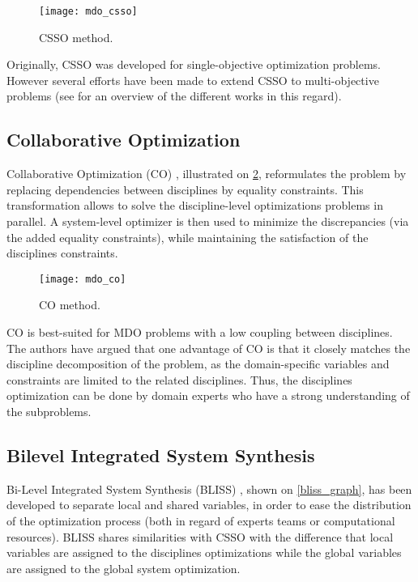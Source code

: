\begin{figure}
\centering
\texttt{[image: mdo\_csso]}
\caption{CSSO method.}\label{csso_graph}
\end{figure}

Originally, CSSO was developed for single-objective optimization problems. However several efforts have been made to extend CSSO to multi-objective problems (see \cite{zhang2011} for an overview of the different works in this regard).

\subsection{Collaborative Optimization}

Collaborative Optimization (CO) \cite{Ilan:1994:MOM:887207}, illustrated on \figurename{} \ref{co_graph}, reformulates the problem by replacing dependencies between disciplines by equality constraints. This transformation allows to solve the discipline-level optimizations problems in parallel. A system-level optimizer is then used to minimize the discrepancies (via the added equality constraints), while maintaining the satisfaction of the disciplines constraints.

\begin{figure}
\centering
\texttt{[image: mdo\_co]}
\caption{CO method.}\label{co_graph}
\end{figure}

CO is best-suited for MDO problems with a low coupling between disciplines. The authors have argued that one advantage of CO is that it closely matches the discipline decomposition of the problem, as the domain-specific variables and constraints are limited to the related disciplines. Thus, the disciplines optimization can be done by domain experts who have a strong understanding of the subproblems.

\subsection{Bilevel Integrated System Synthesis}

Bi-Level Integrated System Synthesis (BLISS) \cite{J.:1998:BIS:886310}, shown on \figurename{} \ref{bliss_graph}, has been developed to separate local and shared variables, in order to ease the distribution of the optimization process (both in regard of experts teams or computational resources).
BLISS shares similarities with CSSO with the difference that local variables are assigned to the disciplines optimizations while the global variables are assigned to the global system optimization.

